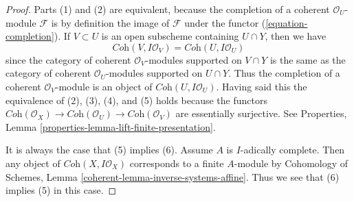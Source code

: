 \begin{proof}
Parts (1) and (2) are equivalent, because the completion of a coherent
$\mathcal{O}_U$-module $\mathcal{F}$ is by definition the image of
$\mathcal{F}$ under the functor (\ref{equation-completion}).
If $V \subset U$ is an open subscheme containing $U \cap Y$, then we have
$$
\textit{Coh}(V, I\mathcal{O}_V) =
\textit{Coh}(U, I\mathcal{O}_U)
$$
since the category of coherent $\mathcal{O}_V$-modules supported on
$V \cap Y$ is the same as the category of coherent $\mathcal{O}_U$-modules
supported on $U \cap Y$. Thus the completion of a coherent
$\mathcal{O}_V$-module is an object of $\textit{Coh}(U, I\mathcal{O}_U)$.
Having said this the equivalence of (2), (3), (4), and (5)
holds because the functors
$\textit{Coh}(\mathcal{O}_X) \to \textit{Coh}(\mathcal{O}_U) \to
\textit{Coh}(\mathcal{O}_V)$ are essentially surjective.
See Properties, Lemma \ref{properties-lemma-lift-finite-presentation}.

\medskip\noindent
It is always the case that (5) implies (6). Assume $A$ is $I$-adically complete.
Then any object of $\textit{Coh}(X, I\mathcal{O}_X)$ corresponds to a finite
$A$-module by Cohomology of Schemes, Lemma
\ref{coherent-lemma-inverse-systems-affine}.
Thus we see that (6) implies (5) in this case.
\end{proof}

